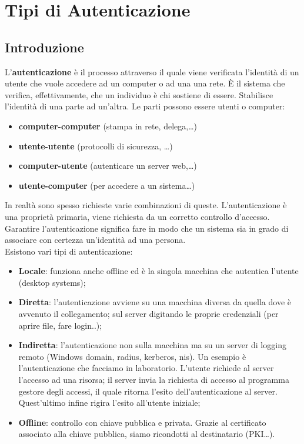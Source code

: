 \chapter{Tipi di Autenticazione}

\section{Introduzione}

L'\textbf{autenticazione} è il processo attraverso il quale viene verificata
l'identità di un utente che vuole
accedere ad un computer o ad una una rete. È il sistema che verifica,
effettivamente, che un
individuo è chi sostiene di essere. Stabilisce l'identità di una parte ad un'altra.
Le parti possono essere utenti o computer:

\begin{itemize}
    \item \textbf{computer-computer} (stampa in rete, delega,…)
    \item \textbf{utente-utente} (protocolli di sicurezza, …)
    \item \textbf{computer-utente} (autenticare un server web,…)
    \item \textbf{utente-computer} (per accedere a un sistema…)
\end{itemize}

In realtà sono spesso richieste varie combinazioni di queste.
L'autenticazione è una proprietà primaria, viene richiesta da un corretto
controllo d'accesso.
Garantire l'autenticazione significa fare in modo che un sistema sia in grado di
associare con
certezza un'identità ad una persona.\\

Esistono vari tipi di autenticazione:

\begin{itemize}
    \item \textbf{Locale}: funziona anche offline ed è la singola macchina
          che autentica l'utente (desktop systems);
    \item \textbf{Diretta}: l'autenticazione avviene su una macchina diversa
          da quella dove è avvenuto il
          collegamento; sul server digitando le proprie credenziali
          (per aprire file, fare login..);
    \item \textbf{Indiretta}: l'autenticazione non sulla macchina ma su un server
          di logging remoto (Windows
          domain, radius, kerberos, nis). Un esempio è l'autenticazione che
          facciamo in laboratorio. L'utente richiede al server l'accesso ad una
          risorsa; il server invia la richiesta di accesso al
          programma gestore degli accessi, il quale ritorna l'esito
          dell'autenticazione al server. Quest'ultimo
          infine rigira l'esito all'utente iniziale;
    \item \textbf{Offline}: controllo con chiave pubblica e privata.
          Grazie al certificato associato alla chiave
          pubblica, siamo ricondotti al destinatario (PKI…).
\end{itemize}

